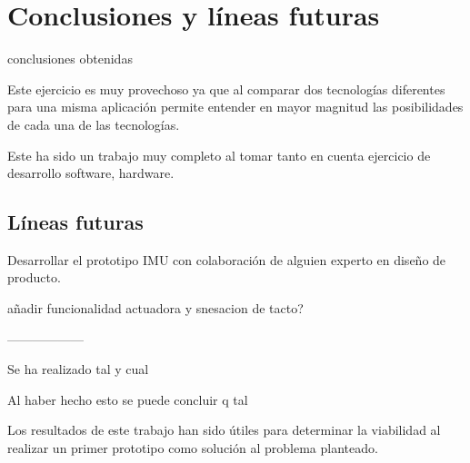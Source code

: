 \chapter{Conclusiones y líneas futuras\label{sec:conclusiones}}

conclusiones obtenidas


Este ejercicio es muy provechoso ya que al comparar dos tecnologías diferentes para una misma aplicación permite entender en mayor magnitud las posibilidades de cada una de las tecnologías. 

Este ha sido un trabajo muy completo al tomar tanto en cuenta ejercicio de desarrollo software, hardware. 



\section{Líneas futuras}

Desarrollar el prototipo IMU con colaboración de alguien experto en diseño de producto.

añadir funcionalidad actuadora y snesacion de tacto?


------------------


Se ha realizado tal y cual

Al haber hecho esto se puede concluir  q tal

Los resultados de este trabajo han sido útiles para determinar la viabilidad al realizar un primer prototipo como solución al problema planteado.

 
